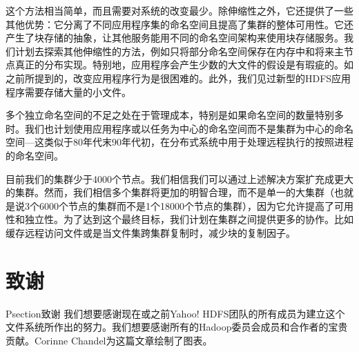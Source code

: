 这个方法相当简单，而且需要对系统的改变最少。除伸缩性之外，它还提供了一些其他优势：它分离了不同应用程序集的命名空间且提高了集群的整体可用性。它还产生了块存储的抽象，让其他服务能用不同的命名空间架构来使用块存储服务。我们计划去探索其他伸缩性的方法，例如只将部分命名空间保存在内存中和将来主节点真正的分布实现。特别地，应用程序会产生少数的大文件的假设是有瑕疵的。如之前所提到的，改变应用程序行为是很困难的。此外，我们见过新型的HDFS应用程序需要存储大量的小文件。

多个独立命名空间的不足之处在于管理成本，特别是如果命名空间的数量特别多时。我们也计划使用应用程序或以任务为中心的命名空间而不是集群为中心的命名空间—这类似于80年代末90年代初，在分布式系统中用于处理远程执行的按照进程的命名空间。

目前我们的集群少于4000个节点。我们相信我们可以通过上述解决方案扩充成更大的集群。然而，我们相信多个集群将更加的明智合理，而不是单一的大集群（也就是说3个6000个节点的集群而不是1个18000个节点的集群），因为它允许提高了可用性和独立性。为了达到这个最终目标，我们计划在集群之间提供更多的协作。比如缓存远程访问文件或是当文件集跨集群复制时，减少块的复制因子。

\section*{致谢}
P{section}{致谢}
我们想要感谢现在或之前Yahoo! HDFS团队的所有成员为建立这个文件系统所作出的努力。我们想要感谢所有的Hadoop委员会成员和合作者的宝贵贡献。Corinne Chandel为这篇文章绘制了图表。

